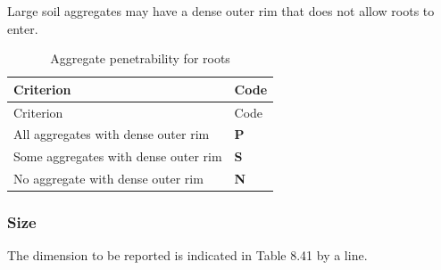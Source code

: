 \documentclass[
  letterpaper,
  DIV=11,
  numbers=noendperiod]{scrreprt}
\begin{document}
Large soil aggregates may have a dense outer rim that does not allow
roots to enter.

\begin{longtable}[]{@{}ll@{}}
\caption{Aggregate penetrability for roots}\tabularnewline
\toprule()
Criterion & Code \\
\midrule()
\endfirsthead
\toprule()
Criterion & Code \\
\midrule()
\endhead
All aggregates with dense outer rim & \textbf{P} \\
Some aggregates with dense outer rim & \textbf{S} \\
No aggregate with dense outer rim & \textbf{N} \\
\bottomrule()
\end{longtable}

\hypertarget{size-1}{%
\subsubsection{Size}\label{size-1}}

The dimension to be reported is indicated in Table 8.41 by a line.
\end{document}
